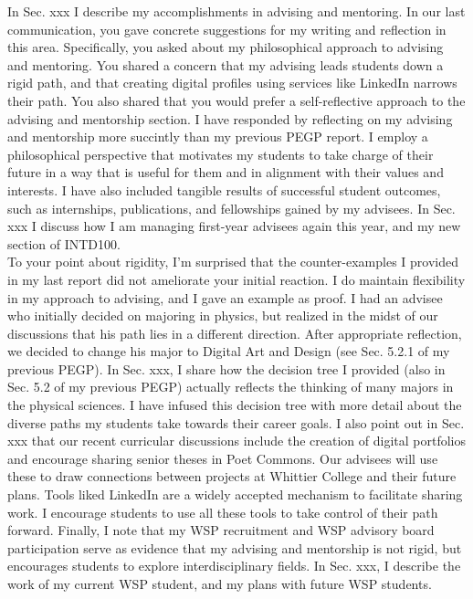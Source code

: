 \documentclass[../../main.tex]{subfiles}
\begin{document}
In Sec. xxx I describe my accomplishments in advising and mentoring.  In our last communication, you gave concrete suggestions for my writing and reflection in this area.  Specifically, you asked about my philosophical approach to advising and mentoring.  You shared a concern that my advising leads students down a rigid path, and that creating digital profiles using services like LinkedIn narrows their path.  You also shared that you would prefer a self-reflective approach to the advising and mentorship section.  I have responded by reflecting on my advising and mentorship more succintly than my previous PEGP report.  I employ a philosophical perspective that motivates my students to take charge of their future in a way that is useful for them and in alignment with their values and interests.  I have also included tangible results of successful student outcomes, such as internships, publications, and fellowships gained by my advisees.  In Sec. xxx I discuss how I am managing first-year advisees again this year, and my new section of INTD100.
\\
\vspace{0.25cm}
To your point about rigidity, I'm surprised that the counter-examples I provided in my last report did not ameliorate your initial reaction.  I do maintain flexibility in my approach to advising, and I gave an example as proof.  I had an advisee who initially decided on majoring in physics, but realized in the midst of our discussions that his path lies in a different direction.  After appropriate reflection, we decided to change his major to Digital Art and Design (see Sec. 5.2.1 of my previous PEGP).  In Sec. xxx, I share how the decision tree I provided (also in Sec. 5.2 of my previous PEGP) actually reflects the thinking of many majors in the physical sciences.  I have infused this decision tree with more detail about the diverse paths my students take towards their career goals.  I also point out in Sec. xxx that our recent curricular discussions include the creation of digital portfolios and encourage sharing senior theses in Poet Commons.  Our advisees will use these to draw connections between projects at Whittier College and their future plans.  Tools liked LinkedIn are a widely accepted mechanism to facilitate sharing work.  I encourage students to use all these tools to take control of their path forward. Finally, I note that my WSP recruitment and WSP advisory board participation serve as evidence that my advising and mentorship is not rigid, but encourages students to explore interdisciplinary fields.  In Sec. xxx, I describe the work of my current WSP student, and my plans with future WSP students.
\end{document}

